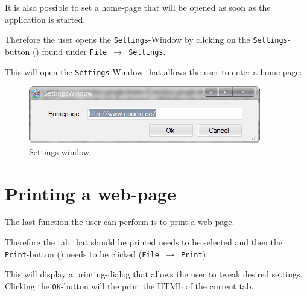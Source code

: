 It is also possible to set a home-page that will be opened as soon as the application is started.

Therefore the user opens the \texttt{Settings}-Window by clicking on the \texttt{Settings}-button () found under \texttt{File $\rightarrow$ Settings}.

This will open the \texttt{Settings}-Window that allows the user to enter a home-page:

\begin{figure}[H]
\begin{center}
\includegraphics[scale=1]{gfx/settings_menu.png}
\caption{Settings window.}
\label{fig:settings_window}
\end{center}
\end{figure}

\section{Printing a web-page}
\label{sec:printing_web_page}

The last function the user can perform is to print a web-page.

Therefore the tab that should be printed needs to be selected and then the \texttt{Print}-button () needs to be clicked (\texttt{File $\rightarrow$ Print}).

This will display a printing-dialog that allows the user to tweak desired settings. Clicking the \texttt{OK}-button will the print the \ac{HTML} of the current tab.